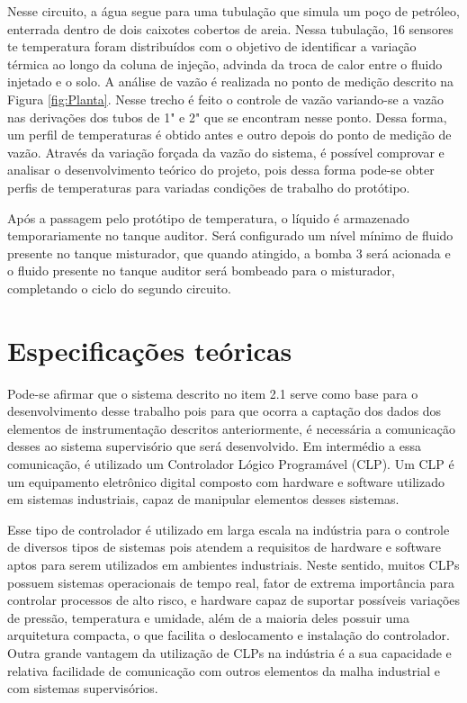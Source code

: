 Nesse circuito, a água segue para uma tubulação que simula um poço de petróleo, enterrada dentro de dois caixotes cobertos de areia. Nessa tubulação, 16 sensores te temperatura foram distribuídos com o objetivo de identificar a variação térmica ao longo da coluna de injeção, advinda da troca de calor entre o fluido injetado e o solo. A análise de vazão é realizada no ponto de medição descrito na Figura \ref{fig:Planta}. Nesse trecho é feito o controle de vazão variando-se a vazão nas derivações dos tubos de 1" e 2" que se encontram nesse ponto. Dessa forma, um perfil de temperaturas é obtido antes e outro depois do ponto de medição de vazão. Através da variação forçada da vazão do sistema, é possível comprovar e analisar o desenvolvimento teórico do projeto, pois dessa forma pode-se obter perfis de temperaturas para variadas condições de trabalho do protótipo.

Após a passagem pelo protótipo de temperatura, o líquido é armazenado temporariamente no tanque auditor. Será configurado um nível mínimo de fluido presente no tanque misturador, que quando atingido, a bomba 3 será acionada e o fluido presente no tanque auditor será bombeado para o misturador, completando o ciclo do segundo circuito.

\section{Especificações teóricas}

Pode-se afirmar que o sistema descrito no item 2.1 serve como base para o desenvolvimento desse trabalho pois para que ocorra a captação dos dados dos elementos de instrumentação descritos anteriormente, é necessária a comunicação desses ao sistema supervisório que será desenvolvido. Em intermédio a essa comunicação, é utilizado um Controlador Lógico Programável (CLP). Um CLP é um equipamento eletrônico digital composto com hardware e software utilizado em sistemas industriais, capaz de manipular elementos desses sistemas.

Esse tipo de controlador é utilizado em larga escala na indústria para o controle de diversos tipos de sistemas pois atendem a requisitos de hardware e software aptos para serem utilizados em ambientes industriais. Neste sentido, muitos CLPs possuem sistemas operacionais de tempo real, fator de extrema importância para controlar processos de alto risco, e hardware capaz de suportar possíveis variações de pressão, temperatura e umidade, além de a maioria deles possuir uma arquitetura compacta, o que facilita o deslocamento e instalação do controlador. Outra grande vantagem da utilização de CLPs na indústria é a sua capacidade e relativa facilidade de comunicação com outros elementos da malha industrial e com sistemas supervisórios.

